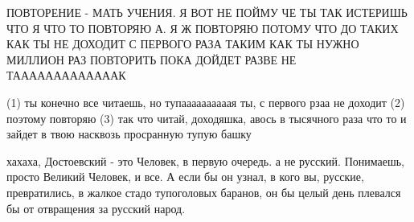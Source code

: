 ПОВТОРЕНИЕ - МАТЬ УЧЕНИЯ. Я ВОТ НЕ ПОЙМУ ЧЕ ТЫ ТАК ИСТЕРИШЬ ЧТО Я ЧТО ТО
ПОВТОРЯЮ А. Я Ж ПОВТОРЯЮ ПОТОМУ ЧТО ДО ТАКИХ КАК ТЫ НЕ ДОХОДИТ С ПЕРВОГО РАЗА
ТАКИМ КАК ТЫ НУЖНО МИЛЛИОН РАЗ ПОВТОРИТЬ ПОКА ДОЙДЕТ РАЗВЕ НЕ ТАААААААААААААК

(1) ты конечно все читаешь, но тупаааааааааая ты, с первого рзаа не доходит (2)
поэтому повторяю (3) так что читай, доходяшка, авось в тысячного раза что то и
зайдет в твою насквозь просранную тупую башку

хахаха, Достоевский - это Человек, в первую очередь. а не русский. Понимаешь,
просто Великий Человек, и все. А если бы он узнал, в кого вы, русские,
превратились, в жалкое стадо тупоголовых баранов, он бы целый день плевался бы
от отвращения за русский народ.


